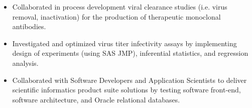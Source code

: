 \documentclass[10pt,a4paper]{altacv}
\begin{document}
\medskip







\begin{itemize}
    \item   \small{Collaborated in process development viral clearance studies (i.e. virus removal, inactivation) for the production of therapeutic monoclonal antibodies.}
    \item   \small{Investigated and optimized virus titer infectivity assays by implementing design of experiments (using SAS JMP), inferential statistics, and regression analysis.}
\end{itemize}

\medskip



\begin{itemize}
    \item   \small{Collaborated with Software Developers and Application Scientists to deliver scientific informatics product suite solutions by testing software front-end, software architecture, and Oracle relational databases.}
\end{itemize}
\end{document}
